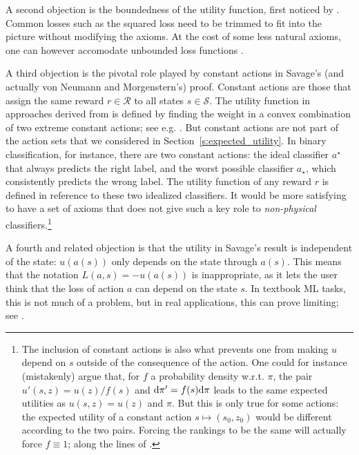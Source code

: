 A second objection is the boundedness of the utility function, first noticed by \citep{Fis70}. 
Common losses such as the squared loss need to be trimmed to fit into the picture without modifying the axioms.
At the cost of some less natural axioms, one can however accomodate unbounded loss functions \citep{Wak93}.

A third objection is the pivotal role played by constant actions in Savage's (and actually von Neumann and Morgenstern's) proof.
Constant actions are those that assign the same reward $r\in\mathcal{R}$ to all states $s\in\mathcal{S}$.
The utility function in approaches derived from \cite{VoMo} is defined by finding the weight in a convex combination of two extreme constant actions; see e.g. \citep[Chapter 3]{PaIn09}. 
But constant actions are not part of the action sets that we considered in Section~\ref{s:expected_utility}.
In binary classification, for instance, there are two constant actions: the ideal classifier $a^\star$ that always predicts the right label, and the worst possible classifier $a_\star$, which consistently predicts the wrong label. 
The utility function of any reward $r$ is defined in reference to these two idealized classifiers.  
It would be more satisfying to have a set of axioms that does not give such a key role to \emph{non-physical} classifiers.\footnote{
  The inclusion of constant actions is also what prevents one from making $u$ depend on $s$ outside of the consequence of the action. 
  One could for instance (mistakenly) argue that, for $f$ a probability density w.r.t. $\pi$, the pair $u'(s,z) = u(z)/f(s)$ and $\mathrm{d}\pi' = f(s)\mathrm{d}\pi$ leads to the same expected utilities as $u(s,z) = u(z)$ and $\pi$.
  But this is only true for some actions: the expected utility of a constant action $s\mapsto (s_0,z_0)$ would be different according to the two pairs.
  Forcing the rankings to be the same will actually force $f\equiv 1$; along the lines of \citep[Lemma 3.141]{Sch12}.
} 

A fourth and related objection is that the utility in Savage's result is independent of the state: $u(a(s))$ only depends on the state through $a(s)$. 
This means that the notation $L(a,s) = -u(a(s))$ is inappropriate, as it lets the user think that the loss of action $a$ can depend on the state $s$. 
In textbook ML tasks, this is not much of a problem, but in real applications, this can prove limiting; see \citep[Chapter XXX]{PaIn09}.


